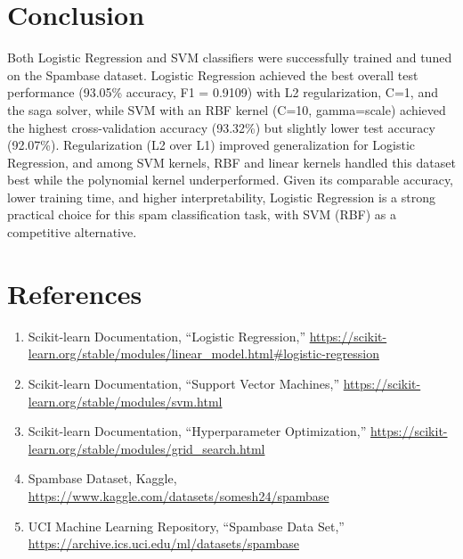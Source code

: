 \documentclass[12pt,a4paper]{article}
\begin{document}
\section{Conclusion}
Both Logistic Regression and SVM classifiers were successfully trained and tuned on the
Spambase dataset. Logistic Regression achieved the best overall test performance (93.05\%
accuracy, F1 = 0.9109) with L2 regularization, C=1, and the saga solver, while SVM with an RBF
kernel (C=10, gamma=scale) achieved the highest cross-validation accuracy (93.32\%) but
slightly lower test accuracy (92.07\%). Regularization (L2 over L1) improved generalization for
Logistic Regression, and among SVM kernels, RBF and linear kernels handled this dataset best
while the polynomial kernel underperformed. Given its comparable accuracy, lower training time,
and higher interpretability, Logistic Regression is a strong practical choice for this spam
classification task, with SVM (RBF) as a competitive alternative.

\section{References}
\begin{enumerate}
\item Scikit-learn Documentation, ``Logistic Regression,'' \url{https://scikit-learn.org/stable/modules/linear_model.html#logistic-regression}
\item Scikit-learn Documentation, ``Support Vector Machines,'' \url{https://scikit-learn.org/stable/modules/svm.html}
\item Scikit-learn Documentation, ``Hyperparameter Optimization,'' \url{https://scikit-learn.org/stable/modules/grid_search.html}
\item Spambase Dataset, Kaggle, \url{https://www.kaggle.com/datasets/somesh24/spambase}
\item UCI Machine Learning Repository, ``Spambase Data Set,'' \url{https://archive.ics.uci.edu/ml/datasets/spambase}
\end{enumerate}
\end{document}
